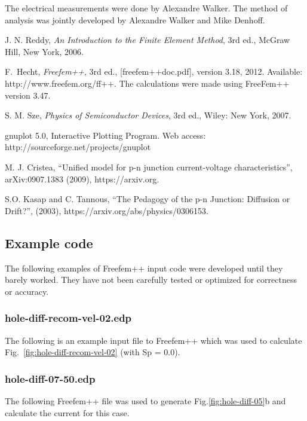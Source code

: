 The electrical measurements were done by Alexandre Walker.  The method
of analysis was jointly developed by Alexandre Walker and Mike Denhoff.


\begin{thebibliography}{1}
 J. N. Reddy, \textit{An Introduction to the Finite Element
      Method}, 3rd ed., McGraw Hill, New York, 2006.

  F.~Hecht, \textit{Freefem++}, 3rd ed., [freefem++doc.pdf], version 3.18, 2012.
  Available: http://www.freefem.org/ff++.  The calculations were made using
  FreeFem++ version  3.47.

S. M. Sze, \textit{Physics of Semiconductor Devices}, 3rd ed.,
         Wiley: New York, 2007.

       gnuplot 5.0, Interactive Plotting Program.
     Web access: http://sourceforge.net/projects/gnuplot

 M. J. Cristea, ``Unified model for p-n junction current-voltage
   characteristics'', arXiv:0907.1383 (2009), https://arxiv.org.

 S.O. Kasap and C. Tannous, ``The Pedagogy of the p-n Junction:
      Diffusion or Drift?'', (2003), https://arxiv.org/abs/physics/0306153.


\end{thebibliography}

\onecolumngrid

  \subsection{Example code}

The following examples of Freefem++ input code were developed until
they barely worked.  They have not been carefully tested or optimized for
correctness or accuracy.

   \subsubsection{hole-diff-recom-vel-02.edp}


The following is an example input file to Freefem++ which was used
to calculate Fig.~\ref{fig:hole-diff-recom-vel-02} (with Sp = 0.0).



    \subsubsection{hole-diff-07-50.edp}
The following Freefem++ file was used to generate Fig.\ref{fig:hole-diff-05}b
and calculate the current for this case.

